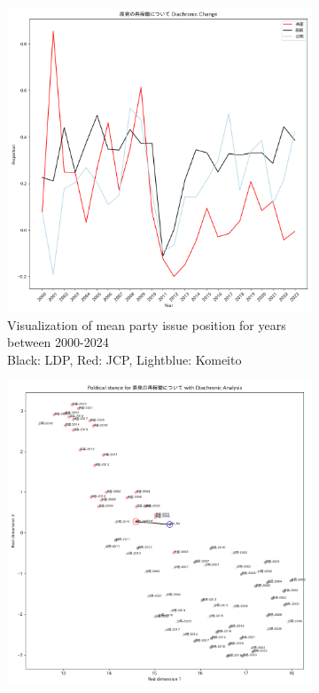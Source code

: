 \documentclass[final,5p,times,twocolumn,authoryear]{elsarticle}
\begin{document}
\begin{figure}[h]
	\centering
		\begin{subfigure}{0.48\textwidth}
		  \centering
		  \includegraphics[width=\textwidth]{figs/results/diachronic_nuclear/restarting_diachronic_change.png}
		  \caption{Visualization of mean party issue position for years between 2000-2024 \\\hspace{\textwidth}  Black: LDP, Red: JCP, Lightblue: Komeito}
		  \label{fig:sub1}
		\end{subfigure}
		\hfill
		\begin{subfigure}{0.48\textwidth}
		  \centering
		  \includegraphics[width=\textwidth]{figs/results/diachronic_nuclear/restarting_diachronic_umap.png}

\end{subfigure}
\end{figure}
\end{document}
